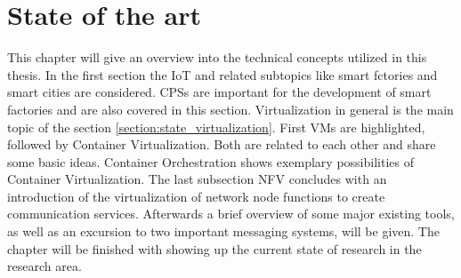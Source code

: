 


\chapter{State of the art}
\label{chapter:state-of-the-art}
\minitoc\vspace{.5cm}

This chapter will give an overview into the technical concepts utilized in this thesis.
In the first section the \ac{IoT} and related subtopics like smart fctories and smart cities are considered.
\acp{CPS} are important for the development of smart factories and are also covered in this section.
Virtualization in general is the main topic of the section \ref{section:state_virtualization}.
First \acp{VM} are highlighted, followed by Container Virtualization.
Both are related to each other and share some basic ideas.
Container Orchestration shows exemplary possibilities of Container Virtualization.
The last subsection \ac{NFV} concludes with an introduction of the virtualization of network node functions to create communication services.
Afterwards a brief overview of some major existing tools, as well as an excursion to two important messaging systems, will be given.
The chapter will be finished with showing up the current state of research in the research area.


